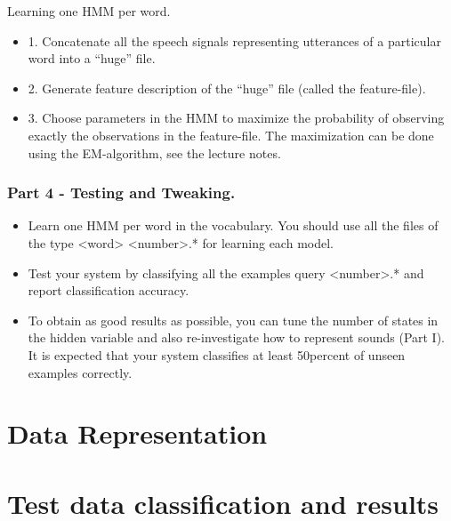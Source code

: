 \documentclass[titlepage]{article}
\begin{document}
Learning one HMM per word. 
\begin{itemize}
\item 1. Concatenate all the speech signals representing utterances of a particular word into a “huge” ﬁle.
\item 2. Generate feature description of the “huge” ﬁle (called the feature-ﬁle).
\item 3. Choose parameters in the HMM to maximize the probability of observing exactly the observations in the feature-ﬁle. The maximization can be done using the EM-algorithm, see the lecture notes.
\end{itemize}

    \subsubsection{Part 4 - Testing and Tweaking. }

\begin{itemize}
\item Learn one HMM per word in the vocabulary. You should use all the ﬁles of the type <word> <number>.* for learning each model.
\item Test your system by classifying all the examples query <number>.* and report classiﬁcation accuracy.
\item To obtain as good results as possible, you can tune the number of states in the hidden variable and also re-investigate how to represent sounds (Part I). It is expected that your system classiﬁes at least 50percent of unseen examples correctly.
\end{itemize}

\section{Data Representation}
  
\section{Test data classification and results}



\end{document}
